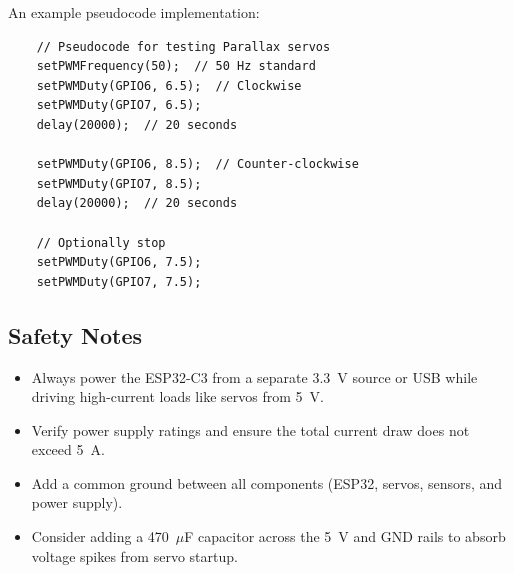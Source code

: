 \documentclass[conference]{IEEEtran}
\begin{document}
An example pseudocode implementation:

\begin{lstlisting}
    // Pseudocode for testing Parallax servos
    setPWMFrequency(50);  // 50 Hz standard
    setPWMDuty(GPIO6, 6.5);  // Clockwise
    setPWMDuty(GPIO7, 6.5);
    delay(20000);  // 20 seconds

    setPWMDuty(GPIO6, 8.5);  // Counter-clockwise
    setPWMDuty(GPIO7, 8.5);
    delay(20000);  // 20 seconds

    // Optionally stop
    setPWMDuty(GPIO6, 7.5);
    setPWMDuty(GPIO7, 7.5);
\end{lstlisting}

\subsection{Safety Notes}
\begin{itemize}
    \item Always power the ESP32-C3 from a separate 3.3~V source or USB while driving high-current loads like servos from 5~V.
    \item Verify power supply ratings and ensure the total current draw does not exceed 5~A.
    \item Add a common ground between all components (ESP32, servos, sensors, and power supply).
    \item Consider adding a 470~$\mu$F capacitor across the 5~V and GND rails to absorb voltage spikes from servo startup.
\end{itemize}
\end{document}
